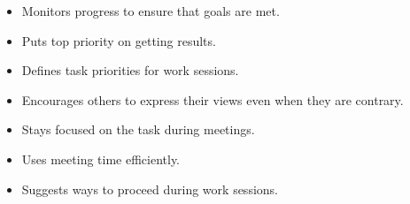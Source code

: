 \begin{itemize}
  \begin{itemize}
  \tightlist
  \item
    Monitors progress to ensure that goals are met.
  \item
    Puts top priority on getting results.
  \item
    Defines task priorities for work sessions.
  \item
    Encourages others to express their views even when they are contrary.
  \item
    Stays focused on the task during meetings.
  \item
    Uses meeting time efficiently.
  \item
    Suggests ways to proceed during work sessions.
  \end{itemize}
\end{itemize}
